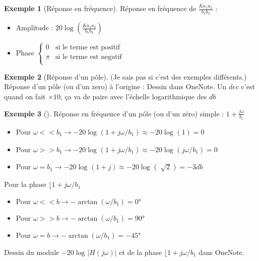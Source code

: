 \documentclass{article}
\theoremstyle{plain}%
\theoremstyle{definition}
\newtheorem{exmp}{Exemple}[section]
\theoremstyle{remark}
\begin{document}
\begin{exmp}[Réponse en fréquence]
    Réponse en fréquence de $ \frac{Ka_1 a_2}{b_1 b_3} $ : \begin{itemize}
        \item Amplitude : $ 20 \log_{} (\frac{Ka_1 a_2}{b_1 b_3}) $ 
        \item Phase $ \begin{cases}
        0 &\text{si le terme est positif}\\
        \pi  &\text{si le terme est negatif}\\
        \end{cases}  $ 
    \end{itemize}
\end{exmp}
\begin{exmp}[Réponse d'un pôle]
    (Je sais pas si c'est des exemples différents.)
    Réponse d'un pôle (ou d'un zero) à l'origine : Dessin dans OneNote. Un $ dec $ c'est quand on fait $ \times 10  $, ça va de paire avec l'échelle logarithmique des $ db $ 
\end{exmp}
\begin{exmp}[]
    Réponse en fréquence d'un pôle (ou d'un zéro) simple : $ 1 + \frac{j \omega}{b_1} $ \begin{itemize}
        \item Pour $ \omega << b_1 \rightarrow -20 \log_{} (1 + j \omega/b_1) \approx -20 \log_{} (1) = 0$ 
        \item Pour $ \omega >> b_1 \rightarrow -20 \log_{} (1 + j \omega/b_1) \approx -20 \log_{} (j \omega / b_1) = 0$ 
        \item Pour $ \omega = b_1 \rightarrow -20 \log_{} (1 + j) \approx -20 \log_{} (\sqrt[]{2}) = -3 db$ 
    \end{itemize}
    Pour la phase $ \lfloor 1 + j \omega / b_1 $
    \begin{itemize}
        \item Pour $ \omega << b \rightarrow -\arctan (\omega /b_1) = 0\text{°} $ 
        \item Pour $ \omega >> b \rightarrow -\arctan (\omega /b_1) = 90\text{°} $ 
        \item Pour $ \omega = b \rightarrow -\arctan (\omega /b_1) =-45\text{°} $ 
    \end{itemize}
    Dessin du module $ -20 \log_{} \left|  H(j \omega) \right|  $ et de la phase $ \lfloor 1 + j \omega / b_1 $  dans OneNote. 
\end{exmp}
\end{document}
